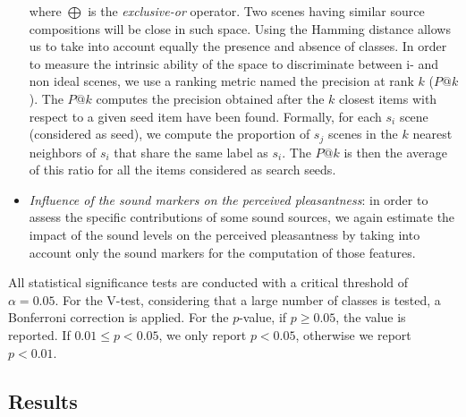 \documentclass[12pt]{elsarticle}
\begin{document}
\begin{itemize}
where $\bigoplus$ is the \emph{exclusive-or} operator. Two scenes having similar source compositions will be close in such space. Using the Hamming distance allows us to take into account equally the presence and absence of classes. In order to measure the intrinsic ability of the space to discriminate between i- and non ideal scenes, we use a ranking metric named the precision at rank $k$ ($P@k$). The $P@k$ computes the precision obtained after the $k$ closest items with respect to a given seed item have been found. Formally, for each $s_i$ scene (considered as seed), we compute the proportion of $s_j$ scenes in the $k$ nearest neighbors of $s_i$ that share the same label as $s_i$. The $P@k$ is then the average of this ratio for all the items considered as search seeds.


\item \emph{Influence of the sound markers on the perceived pleasantness}: in order to assess the specific contributions of some sound sources, we again estimate the impact of the sound levels on the perceived pleasantness by taking into account only the sound markers for the computation of those features.
\end{itemize}


All statistical significance tests are conducted with a critical threshold of $\alpha=0.05$. For the V-test, considering that a large number of classes is tested, a Bonferroni correction is applied. For the $p$-value, if $p\geq0.05$, the value is reported. If $0.01\leq p<0.05$, we only report $p<0.05$, otherwise we report $p<0.01$.

\subsection{Results}
\end{document}
